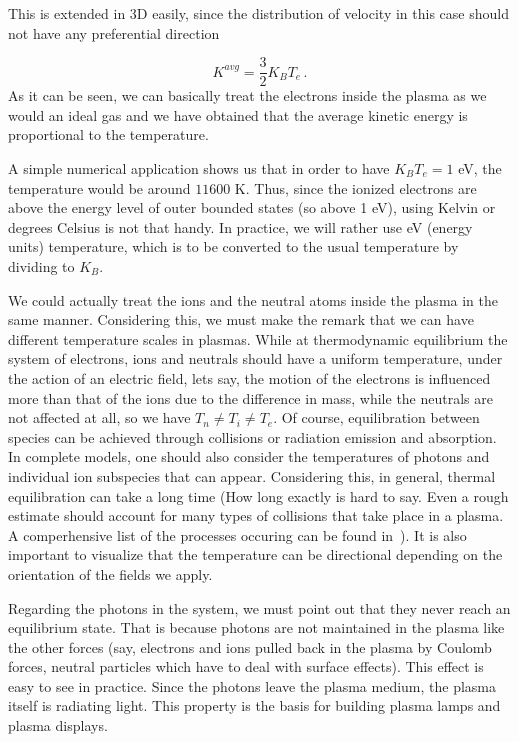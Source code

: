 \documentclass[12pt, class=report, crop=false]{standalone}
\begin{document}
This is extended in 3D easily, since the distribution of velocity in this case should not have any preferential direction

\begin{equation}
  K^{avg} = \frac{3}{2} K_B T_e\,.
\end{equation}
As it can be seen, we can basically treat the electrons inside the plasma as we would an ideal gas and we have obtained that the average kinetic energy is proportional to the temperature.

A simple numerical application shows us that in order to have \(K_B T_e = 1\) eV, the temperature would be around \(11600\) K. Thus, since the ionized electrons are above the energy level of outer bounded states (so above 1 eV), using Kelvin or degrees Celsius is not that handy. In practice, we will rather use eV (energy units) temperature, which is to be converted to the usual temperature by dividing to \(K_B\).

We could actually treat the ions and the neutral atoms inside the plasma in the same manner. Considering this, we must make the remark that we can have different temperature scales in plasmas. While at thermodynamic equilibrium the system of electrons, ions and neutrals should have a uniform temperature, under the action of an electric field, lets say, the motion of the electrons is influenced more than that of the ions due to the difference in mass, while the neutrals are not affected at all, so we have \(T_n\neq T_i\neq T_e\). Of course, equilibration between species can be achieved through collisions or radiation emission and absorption. In complete models, one should also consider the temperatures of photons and individual ion subspecies that can appear. Considering this, in general, thermal equilibration can take a long time (How long exactly is hard to say. Even a rough estimate should account for many types of collisions that take place in a plasma. A comperhensive list of the processes occuring can be found in~\cite{braithwaiteIntroductionGasDischarges2000}). It is also important to visualize that the temperature can be directional depending on the orientation of the fields we apply.

Regarding the photons in the system, we must point out that they never reach an equilibrium state. That is because photons are not maintained in the plasma like the other forces (say, electrons and ions pulled back in the plasma by Coulomb forces, neutral particles which have to deal with surface effects). This effect is easy to see in practice. Since the photons leave the plasma medium, the plasma itself is radiating light. This property is the basis for building plasma lamps and plasma displays.
\end{document}
